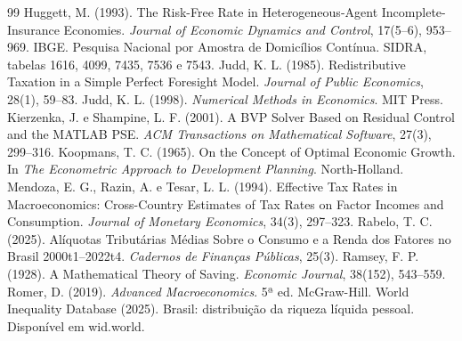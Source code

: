 \documentclass[11pt,a4paper]{article}
\begin{document}
\begin{thebibliography}{99}
 Huggett, M. (1993). The Risk-Free Rate in
Heterogeneous-Agent Incomplete-Insurance Economies. \emph{Journal of Economic
Dynamics and Control}, 17(5--6), 953--969.
 IBGE. Pesquisa Nacional por Amostra de Domicílios Contínua.
SIDRA, tabelas 1616, 4099, 7435, 7536 e 7543.
 Judd, K. L. (1985). Redistributive Taxation in a Simple
Perfect Foresight Model. \emph{Journal of Public Economics}, 28(1), 59--83.
 Judd, K. L. (1998). \emph{Numerical Methods in Economics}.
MIT Press.
 Kierzenka, J. e Shampine, L. F. (2001). A BVP Solver Based
on Residual Control and the MATLAB PSE. \emph{ACM Transactions on Mathematical
Software}, 27(3), 299--316.
 Koopmans, T. C. (1965). On the Concept of Optimal Economic
Growth. In \emph{The Econometric Approach to Development Planning}.
North-Holland.
 Mendoza, E. G., Razin, A. e Tesar, L. L. (1994). Effective Tax
Rates in Macroeconomics: Cross-Country Estimates of Tax Rates on Factor Incomes
and Consumption. \emph{Journal of Monetary Economics}, 34(3), 297--323.
 Rabelo, T. C. (2025). Alíquotas Tributárias Médias Sobre o
Consumo e a Renda dos Fatores no Brasil 2000t1--2022t4. \emph{Cadernos de
Finanças Públicas}, 25(3).
 Ramsey, F. P. (1928). A Mathematical Theory of Saving.
\emph{Economic Journal}, 38(152), 543--559.
 Romer, D. (2019). \emph{Advanced Macroeconomics}. 5ª ed.
McGraw-Hill.
 World Inequality Database (2025). Brasil: distribuição da
riqueza líquida pessoal. Disponível em wid.world.
\end{thebibliography}
\end{document}
